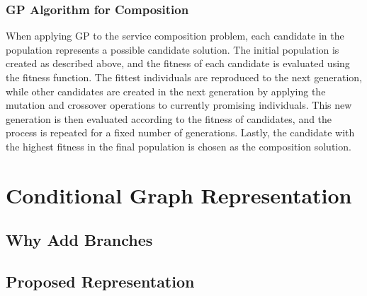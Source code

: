 \subsubsection{GP Algorithm for Composition}
When applying GP to the service composition problem, each candidate in the population represents a possible candidate solution. The initial population is created as described above, and the fitness of each candidate is evaluated using the fitness function. The fittest individuals are reproduced to the next generation, while other candidates are created in the next generation by applying the mutation and crossover operations to currently promising individuals. This new generation is then evaluated according to the fitness of candidates, and the process is repeated for a fixed number of generations. Lastly, the candidate with the highest fitness in the final population is chosen as the composition solution.

% 

\section{Conditional Graph Representation}

\subsection{Why Add Branches}

\subsection{Proposed Representation}

